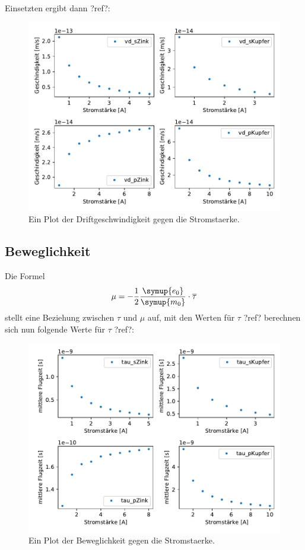     Einsetzten ergibt dann ?ref?:
    \begin{figure}[H]
        \centering
        \includegraphics[width=1.1\textwidth]{build/Driftgeschwindigkeit.pdf}
        \caption{Ein Plot der Driftgeschwindigkeit gegen die Stromstaerke.}
        \label{img:vd}
    \end{figure}


    \subsection{Beweglichkeit}


    Die Formel
    \begin{equation}
        \mu= -\frac{1}{2}\frac{\symup{e_0}}{\symup{m_0}}\cdot   \overline{\tau}
    \end{equation}
    stellt eine Beziehung zwischen $\tau$ und $\mu$ auf, mit den Werten für $\tau$ ?ref? berechnen sich nun folgende Werte 
    für $\tau$ ?ref?:

    \begin{figure}[H]
        \centering
        \includegraphics[width=1.1\textwidth]{build/tau.pdf}
        \caption{Ein Plot der Beweglichkeit gegen die Stromstaerke.}
        \label{img:Beweg}
    \end{figure}


